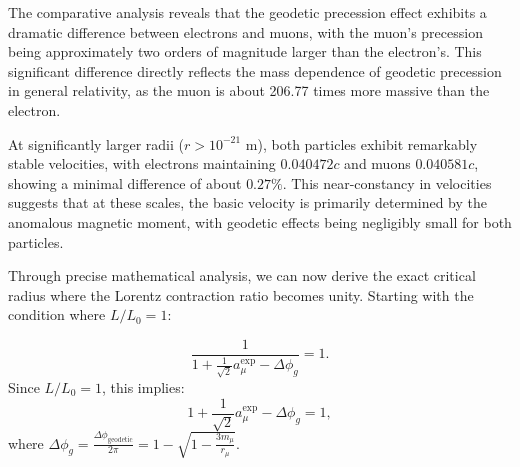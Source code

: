 \documentclass[%
 reprint,
 amsmath,amssymb,
 aps,
]{revtex4-1}
\numberwithin{equation}{section}%
\begin{document}
The comparative analysis reveals that the geodetic precession effect exhibits a dramatic difference between electrons and muons, with the muon's precession being approximately two orders of magnitude larger than the electron's. This significant difference directly reflects the mass dependence of geodetic precession in general relativity, as the muon is about 206.77 times more massive than the electron.

At significantly larger radii ($r > 10^{-21}$ m), both particles exhibit remarkably stable velocities, with electrons maintaining $0.040472c$ and muons $0.040581c$, showing a minimal difference of about $0.27\%$. This near-constancy in velocities suggests that at these scales, the basic velocity is primarily determined by the anomalous magnetic moment, with geodetic effects being negligibly small for both particles.

Through precise mathematical analysis, we can now derive the exact critical radius where the Lorentz contraction ratio becomes unity. Starting with the condition where $L/L_0 = 1$:

\begin{equation}
   \frac{1}{1 + \frac{1}{\sqrt{2}}a^{\text{exp}}_{\mu} - \Delta\phi_g} = 1.
\label{eq:lorentz_ratio_start_corrected}
\end{equation}
Since $L/L_0 = 1$, this implies:
\begin{equation}
   1 + \frac{1}{\sqrt{2}}a^{\text{exp}}_{\mu} - \Delta\phi_g = 1,
\label{eq:basis_equation}
\end{equation}
where $\Delta\phi_g = \frac{\Delta \phi_{\text{geodetic}}}{2\pi} = 1 - \sqrt{1 - \frac{3m_{\mu}}{r_{\mu}}}$.
\end{document}
